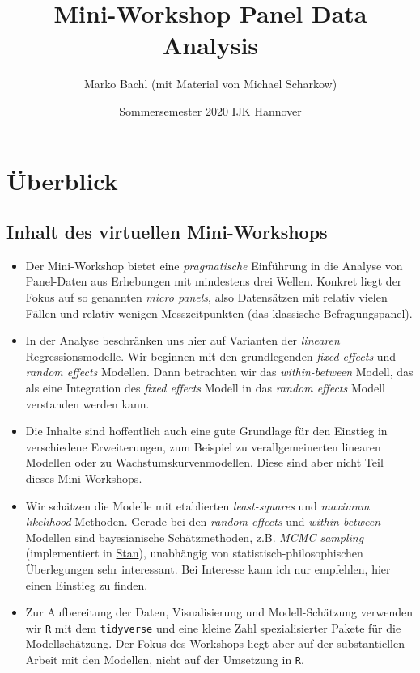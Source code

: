 \documentclass[
]{book}
\title{Mini-Workshop Panel Data Analysis}
\author{Marko Bachl (mit Material von Michael Scharkow)}
\date{Sommersemester 2020 \textbar{} IJK Hannover}
\begin{document}
\maketitle

{
\setcounter{tocdepth}{1}
\tableofcontents
}
\hypertarget{uxfcberblick}{%
\chapter{Überblick}\label{uxfcberblick}}

\hypertarget{inhalt-des-virtuellen-mini-workshops}{%
\section{Inhalt des virtuellen Mini-Workshops}\label{inhalt-des-virtuellen-mini-workshops}}

\begin{itemize}
\item
  Der Mini-Workshop bietet eine \emph{pragmatische} Einführung in die Analyse von Panel-Daten aus Erhebungen mit mindestens drei Wellen. Konkret liegt der Fokus auf so genannten \emph{micro panels}, also Datensätzen mit relativ vielen Fällen und relativ wenigen Messzeitpunkten (das klassische Befragungspanel).
\item
  In der Analyse beschränken uns hier auf Varianten der \emph{linearen} Regressionsmodelle. Wir beginnen mit den grundlegenden \emph{fixed effects} und \emph{random effects} Modellen. Dann betrachten wir das \emph{within-between} Modell, das als eine Integration des \emph{fixed effects} Modell in das \emph{random effects} Modell verstanden werden kann.
\item
  Die Inhalte sind hoffentlich auch eine gute Grundlage für den Einstieg in verschiedene Erweiterungen, zum Beispiel zu verallgemeinerten linearen Modellen oder zu Wachstumskurvenmodellen. Diese sind aber nicht Teil dieses Mini-Workshops.
\item
  Wir schätzen die Modelle mit etablierten \emph{least-squares} und \emph{maximum likelihood} Methoden. Gerade bei den \emph{random effects} und \emph{within-between} Modellen sind bayesianische Schätzmethoden, z.B. \emph{MCMC sampling} (implementiert in \href{https://mc-stan.org/}{Stan}), unabhängig von statistisch-philosophischen Überlegungen sehr interessant. Bei Interesse kann ich nur empfehlen, hier einen Einstieg zu finden.
\item
  Zur Aufbereitung der Daten, Visualisierung und Modell-Schätzung verwenden wir \texttt{R} mit dem \texttt{tidyverse} und eine kleine Zahl spezialisierter Pakete für die Modellschätzung. Der Fokus des Workshops liegt aber auf der substantiellen Arbeit mit den Modellen, nicht auf der Umsetzung in \texttt{R}.
\end{itemize}
\end{document}
